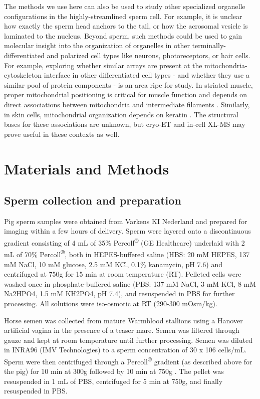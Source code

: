 The methods we use here can also be used to study other specialized organelle configurations in the highly-streamlined sperm cell. For example, it is unclear how exactly the sperm head anchors to the tail, or how the acrosomal vesicle is laminated to the nucleus. Beyond sperm, such methods could be used to gain molecular insight into the organization of organelles in other terminally-differentiated and polarized cell types like neurons, photoreceptors, or hair cells. For example, exploring whether similar arrays are present at the mitochondria-cytoskeleton interface in other differentiated cell types - and whether they use a similar pool of protein components - is an area ripe for study. In striated muscle, proper mitochondrial positioning is critical for muscle function and depends on direct associations between mitochondria and intermediate filaments \cite{Konieczny2008, Milner2000}. Similarly, in skin cells, mitochondrial organization depends on keratin \cite{Steen2020}. The structural bases for these associations are unknown, but cryo-ET and in-cell XL-MS may prove useful in these contexts as well.
\section{Materials and Methods}
\subsection*{Sperm collection and preparation}
Pig sperm samples were obtained from Varkens KI Nederland and prepared for imaging within a few hours of delivery. Sperm were layered onto a discontinuous gradient consisting of 4 mL of 35\% Percoll\textsuperscript{®} (GE Healthcare) underlaid with 2 mL of 70\% Percoll\textsuperscript{®}, both in HEPES-buffered saline (HBS: 20 mM HEPES, 137 mM NaCl, 10 mM glucose, 2.5 mM KCl, 0.1\% kanamycin, pH 7.6) and centrifuged at 750g for 15 min at room temperature (RT). Pelleted cells were washed once in phosphate-buffered saline (PBS: 137 mM NaCl, 3 mM KCl, 8 mM Na2HPO4, 1.5 mM KH2PO4, pH 7.4), and resuspended in PBS for further processing. All solutions were iso-osmotic at RT (290-300 mOsm/kg).

Horse semen was collected from mature Warmblood stallions using a Hanover artificial vagina in the presence of a teaser mare. Semen was filtered through gauze and kept at room temperature until further processing. Semen was diluted in INRA96 (IMV Technologies) to a sperm concentration of 30 x 106 cells/mL. Sperm were then centrifuged through a Percoll\textsuperscript{®} gradient (as described above for the pig) for 10 min at 300g followed by 10 min at 750g \cite{Harrison1993}. The pellet was resuspended in 1 mL of PBS, centrifuged for 5 min at 750g, and finally resuspended in PBS.

